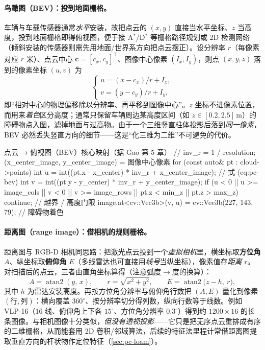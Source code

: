 \paragraph{鸟瞰图（BEV）：投到地面栅格。}
车辆与车载传感器通常\emph{水平}安装，故把点云的 $(x,y)$ 直接当水平坐标、$z$ 当高度，投到地面栅格即得俯视图，便于接 A$^\ast$/D$^\ast$ 等栅格路径规划或 2D 检测网络\cite{gao2023slamad}（倾斜安装的传感器则需先用地面/世界系方向把点云摆正）。设分辨率 $r$（每像素对应 $r$ 米）、点云中心 $\mathbf{c}=[c_x,c_y]^\top$、图像中心像素 $(I_x,I_y)$，则点 $(x,y,z)$ 落到的像素坐标 $(u,v)$ 为
\begin{equation}
  \begin{cases}
    u=(x-c_x)/r+I_x,\\[2pt]
    v=(y-c_y)/r+I_y,
  \end{cases}
  \label{eq:pc-bev}
\end{equation}
即“相对中心的物理偏移除以分辨率、再平移到图像中心”。$z$ 坐标不进像素位置，而用来\emph{着色}区分高度；通常只保留车辆周边某高度区间（如 $z\in[0.2,2.5]\,\mathrm{m}$）的障碍物点入图，滤掉地面与过高物。由于一个三维竖直柱体投影后落到\emph{同一像素}，BEV 必然丢失竖直方向的细节——这是“化三维为二维”不可避免的代价。

\begin{codebox}[C++]{点云 → 俯视图（BEV）核心映射（据 Gao 第 5 章）}
// inv_r = 1 / resolution; (x_center_image, y_center_image) = 图像中心像素
for (const auto& pt : cloud->points) {
  int u = int((pt.x - x_center) * inv_r + x_center_image);   // 式 (eq:pc-bev)
  int v = int((pt.y - y_center) * inv_r + y_center_image);
  if (u < 0 || u >= image_cols || v < 0 || v >= image_rows
      || pt.z < min_z || pt.z > max_z) continue;             // 越界 / 高度门限
  image.at<cv::Vec3b>(v, u) = cv::Vec3b(227, 143, 79);       // 障碍物着色
}
\end{codebox}

\paragraph{距离图（range image）：借相机的规则栅格。}
距离图与 RGB-D 相机同思路：把激光点云投到一个\emph{虚拟相机}里，横坐标取\textbf{方位角} $A$、纵坐标取\textbf{俯仰角} $E$（多线雷达也可直接用\emph{线号}当纵坐标），像素值存\emph{距离} $r$\cite{gao2023slamad}。对扫描后的点云，三者由直角坐标算得（注意弧度$\to$度的换算）：
\begin{equation}
  A=\operatorname{atan2}(y,\,x),\qquad
  r=\sqrt{x^2+y^2},\qquad
  E=\operatorname{atan2}\!\big(z-h,\ r\big),
  \label{eq:pc-rangeimg}
\end{equation}
其中 $h$ 为雷达安装高度。再按方位角分辨率与俯仰角行数把 $(A,E)$ 量化到像素 $(行,列)$：横向覆盖 $360^\circ$、按分辨率切分得列数，纵向行数等于线数。例如 VLP-16（$16$ 线、俯仰角上下各 $15^\circ$、方位角分辨率 $0.3^\circ$）得到约 $1200\times16$ 的长条图像。与相机图像十分类似，\emph{但没有透视投影}——它只是把无序点云重排成有序的二维栅格，从而能套用 2D 卷积/邻域算法，后续的特征法里程计常借距离图提取垂直方向的杆状物作定位特征（\cref{sec:pc-loam}）。

